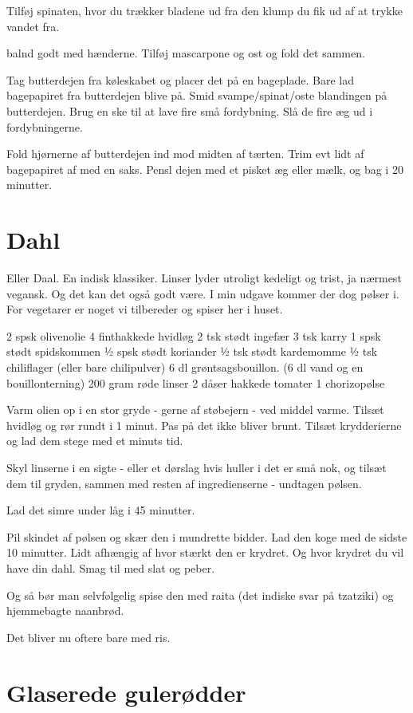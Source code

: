 \documentclass[
]{book}
\begin{document}
Tilføj spinaten, hvor du trækker bladene ud fra den klump du
fik ud af at trykke vandet fra.

balnd godt med hænderne. Tilføj mascarpone og ost og fold det
sammen.

Tag butterdejen fra køleskabet og placer det på en bageplade.
Bare lad bagepapiret fra butterdejen blive på.
Smid svampe/spinat/oste blandingen på butterdejen. Brug en
ske til at lave fire små fordybning. Slå de fire æg ud i
fordybningerne.

Fold hjørnerne af butterdejen ind mod midten af tærten. Trim
evt lidt af bagepapiret af med en saks. Pensl dejen
med et pisket æg eller mælk, og bag i 20 minutter.

\hypertarget{dahl-1}{%
\section{Dahl}\label{dahl-1}}

Eller Daal. En indisk klassiker. Linser lyder utroligt kedeligt og trist, ja nærmest vegansk. Og det kan det også godt være. I min udgave kommer der dog pølser i. For vegetarer er noget vi tilbereder og spiser her i huset.

2 spsk olivenolie
4 finthakkede hvidløg
2 tsk stødt ingefær
3 tsk karry
1 spsk stødt spidskommen
½ spsk stødt koriander
½ tsk stødt kardemomme
½ tsk chiliflager (eller bare chilipulver)
6 dl grøntsagsbouillon. (6 dl vand og en bouillonterning)
200 gram røde linser
2 dåser hakkede tomater
1 chorizopølse

Varm olien op i en stor gryde - gerne af støbejern - ved middel varme. Tilsæt hvidløg og rør rundt i 1 minut. Pas på det ikke bliver brunt. Tilsæt krydderierne og lad dem stege med et minuts tid.

Skyl linserne i en sigte - eller et dørslag hvis huller i det er små nok, og tilsæt dem til gryden, sammen med resten af ingredienserne - undtagen pølsen.

Lad det simre under låg i 45 minutter.

Pil skindet af pølsen og skær den i mundrette bidder. Lad den koge med de sidste 10 minutter. Lidt afhængig af hvor stærkt den er krydret. Og hvor krydret du vil have din dahl. Smag til med slat og peber.

Og så bør man selvfølgelig spise den med raita (det indiske svar på tzatziki) og hjemmebagte naanbrød.

Det bliver nu oftere bare med ris.

\hypertarget{glaserede-guleruxf8dder}{%
\section{Glaserede gulerødder}\label{glaserede-guleruxf8dder}}
\end{document}
